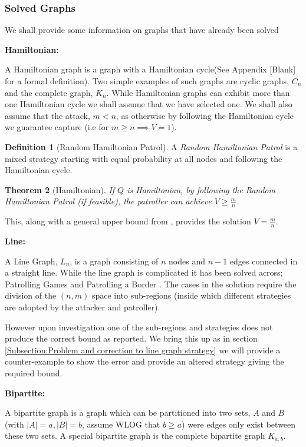 \documentclass[a4paper,10pt]{article}
\newtheorem{theorem}{Theorem}[section]
\theoremstyle{definition}
\newtheorem{definition}[theorem]{Definition}
\theoremstyle{definition}
\theoremstyle{remark}
\theoremstyle{definition}
\begin{document}
\subsubsection{Solved Graphs}
We shall provide some information on graphs that have already been solved

\textbf{Hamiltonian:}

A Hamiltonian graph is a graph with a Hamiltonian cycle(See Appendix [Blank] for a formal definition). Two simple examples of such graphs are cyclic graphs, $C_{n}$ and the complete graph, $K_{n}$. While Hamiltonian graphs can exhibit more than one Hamiltonian cycle we shall assume that we have selected one. We shall also assume that the attack, $m < n$, as otherwise by following the Hamiltonian cycle we guarantee capture (i.e for $m \geq n \implies V=1$).

\begin{definition}[Random Hamiltonian Patrol]
A \textit{Random Hamiltonian Patrol} is a mixed strategy starting with equal probability at all nodes and following the Hamiltonian cycle.
\end{definition}

\begin{theorem}[Hamiltonian]
If $Q$ is Hamiltonian, by following the Random Hamiltonian Patrol (if feasible), the patroller can achieve $V \geq \frac{m}{n}$.
\end{theorem}

This, along with a general upper bound from \citep{Alpern2011}, provides the solution $V=\frac{m}{n}$.

\textbf{Line:}

A Line Graph, $L_{n}$, is a graph consisting of $n$ nodes and $n-1$ edges connected in a straight line.  While the line graph is complicated it has been solved across; Patrolling Games \cite{Alpern2011} and Patrolling a Border \cite{Papadaki2016}. The cases in the solution require the division of the $(n,m)$ space into sub-regions (inside which different strategies are adopted by the attacker and patroller).

However upon investigation one of the sub-regions and strategies does not produce the correct bound as reported. We bring this up as in section \ref{Subsection:Problem and correction to line graph strategy} we will provide a counter-example to show the error and provide an altered strategy giving the required bound.

\textbf{Bipartite:}

A bipartite graph is a graph which can be partitioned into two sets, $A$ and $B$ (with $|A|=a,|B|=b$, assume WLOG that $b \geq a$) were edges only exist between these two sets. A special bipartite graph is the complete bipartite graph $K_{a,b}$.
\end{document}
